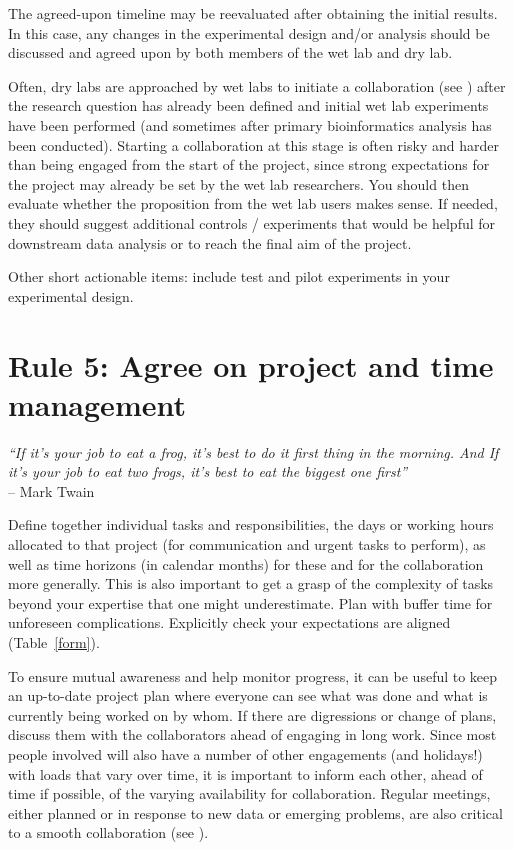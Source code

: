 \documentclass{article}
\begin{document}
The agreed-upon timeline may be reevaluated after obtaining the initial results. In this case, any changes in the experimental design and/or analysis should be discussed and agreed upon by both members of the wet lab and dry lab. 

Often, dry labs are approached by wet labs to initiate a collaboration (see ) after the research question has already been defined and initial wet lab experiments have been performed (and sometimes after primary bioinformatics analysis has been conducted). Starting a collaboration at this stage is often risky and harder than being engaged from the start of the project, since strong expectations for the project may already be set by the wet lab researchers. You should then evaluate whether the proposition from the wet lab users makes sense. If needed, they should suggest additional controls / experiments that would be helpful for downstream data analysis or to reach the final aim of the project.

Other short actionable items: include test and pilot experiments in your experimental design.

\section*{Rule 5: Agree on project and time management} %
\label{rule5_time}

\begin{flushright}
\rightskip=1cm\textit{``If it's your job to eat a frog, it's best to do it first thing in the morning. And If it's your job to eat two frogs, it's best to eat the biggest one first''} \\
\vspace{.2em}
\rightskip=0cm -- Mark Twain
\end{flushright}

Define together individual tasks and responsibilities, the days or working hours allocated to that project (for communication and urgent tasks to perform), as well as time horizons (in calendar months) for these and for the collaboration more generally. This is also important to get a grasp of the complexity of tasks beyond your expertise that one might underestimate. Plan with buffer time for unforeseen complications. Explicitly check your expectations are aligned (Table~\ref{form}).

To ensure mutual awareness and help monitor progress, it can be useful to keep an up-to-date project plan where everyone can see what was done and what is currently being worked on by whom. If there are digressions or change of plans, discuss them with the collaborators ahead of engaging in long work. Since most people involved will also have a number of other engagements (and holidays!) with loads that vary over time, it is important to inform each other, ahead of time if possible, of the varying availability for collaboration. Regular meetings, either planned or in response to new data or emerging problems, are also critical to a smooth collaboration (see ). 
\end{document}
